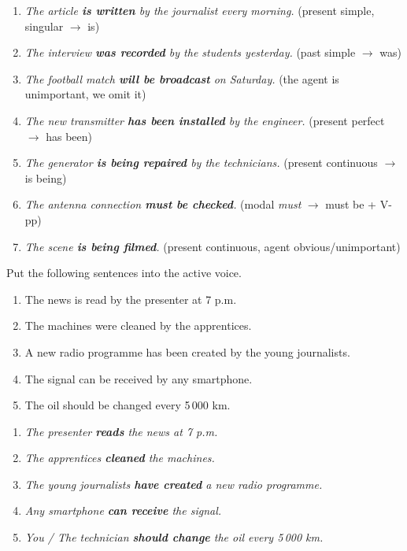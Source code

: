 \documentclass[11pt]{article}
\begin{document}
\begin{corrige}
\begin{enumerate}
\item \emph{The article \textbf{is written} by the journalist every morning.} (present simple, singular $\rightarrow$ is)
\item \emph{The interview \textbf{was recorded} by the students yesterday.} (past simple $\rightarrow$ was)
\item \emph{The football match \textbf{will be broadcast} on Saturday.} (the agent is unimportant, we omit it)
\item \emph{The new transmitter \textbf{has been installed} by the engineer.} (present perfect $\rightarrow$ has been)
\item \emph{The generator \textbf{is being repaired} by the technicians.} (present continuous $\rightarrow$ is being)
\item \emph{The antenna connection \textbf{must be checked}.} (modal \emph{must} $\rightarrow$ must be + V-pp)
\item \emph{The scene \textbf{is being filmed}.} (present continuous, agent obvious/unimportant)
\end{enumerate}
\end{corrige}

\begin{exercice}
Put the following sentences into the active voice.
\begin{enumerate}
\item The news is read by the presenter at 7 p.m.
\item The machines were cleaned by the apprentices.
\item A new radio programme has been created by the young journalists.
\item The signal can be received by any smartphone.
\item The oil should be changed every 5\,000 km.
\end{enumerate}
\end{exercice}

\begin{corrige}
\begin{enumerate}
\item \emph{The presenter \textbf{reads} the news at 7 p.m.}
\item \emph{The apprentices \textbf{cleaned} the machines.}
\item \emph{The young journalists \textbf{have created} a new radio programme.}
\item \emph{Any smartphone \textbf{can receive} the signal.}
\item \emph{You / The technician \textbf{should change} the oil every 5\,000 km.}
\end{enumerate}
\end{corrige}
\end{document}

